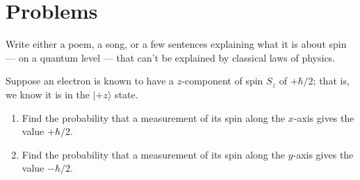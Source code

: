 %

\newpage

\section*{Problems}
\label{sec:spin_problems}



\begin{problem}
Write either a poem, a song, or a few sentences explaining
what it is about spin --- on a quantum level --- that can't be
explained by classical laws of physics. \label{prob:spin_poem}
\end{problem}


\begin{problem}
Suppose an electron is known to have a $z$-component of spin $S_z$ of $+\hbar/2$; that is, we know it is in the $|\mbox{$+z$}\rangle$ state.
\begin{enumerate} 
\item   Find the probability that a measurement of
    its spin along the $x$-axis gives the value $+\hbar/2$.
\item Find the probability that a measurement of its spin along
    the $y$-axis gives the value $-\hbar/2$.
 \end{enumerate}
\label{prob:spin_i}
\end{problem}

